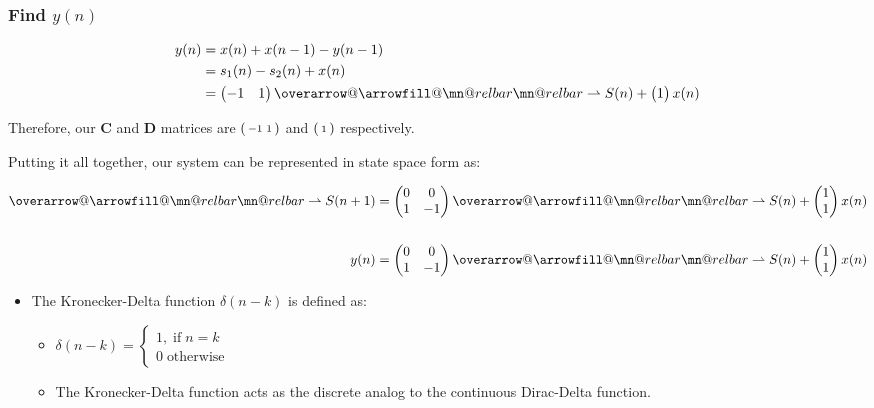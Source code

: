 \documentclass{article}
\makeatletter
\newenvironment{directsubsubs}{
  \makeatletter
  \renewcommand\thesubsubsection{\thesection.\Roman{subsubsection}}
  \makeatother
}{
  \makeatletter
  \renewcommand\thesubsubsection{\thesubsection.\Roman{subsubsection}}
  \makeatother
}
\renewcommand{\thesubsection}{\thesection.\alph{subsection}}
\renewcommand{\thesubsubsection}{\thesection.\alph{subsection}.\Roman{subsubsection}}
\DeclareRobustCommand{\overrightharpoon}{\mathpalette{\overarrow@\rightharpoonfill@}}
\def\rightharpoonfill@{\arrowfill@\mn@relbar\mn@relbar\rightharpoonup}
\makeatother
\begin{document}
\begin{directsubsubs}
\subsubsection[~\thesubsubsection]{Find $y(n)$}

\begin{align*}
	y(n) &= x(n) + x(n-1) - y(n-1) \\
	&= s_1(n) - s_2(n) + x(n) \\
	&= \begin{pmatrix} -1 & 1 \end{pmatrix}\overrightharpoon{S(n)} + \begin{pmatrix} 1 \end{pmatrix}x(n)
\end{align*}

Therefore, our $\boldsymbol{C}$ and $\boldsymbol{D}$ matrices are $\begin{psmallmatrix} -1 & 1 \end{psmallmatrix}$ and $\begin{psmallmatrix} 1 \end{psmallmatrix}$ respectively.

Putting it all together, our system can be represented in state space form as:

\begin{align*}
	\overrightharpoon{S(n+1)} &= \begin{pmatrix} 0 & 0 \\ 1 & -1 \end{pmatrix}\overrightharpoon{S(n)} + \begin{pmatrix} 1 \\ 1 \end{pmatrix}x(n) \\ \\
	y(n) &= \begin{pmatrix} 0 & 0 \\ 1 & -1 \end{pmatrix}\overrightharpoon{S(n)} + \begin{pmatrix} 1 \\ 1 \end{pmatrix}x(n)
\end{align*}

\begin{itemize}
	\item The Kronecker-Delta function $\delta(n - k)$ is defined as:
	\begin{itemize}
		\item $\delta(n - k) = \begin{cases} 1, \; \text{if} \; n = k \\ 0 \; \text{otherwise} \end{cases}$
		\item The Kronecker-Delta function acts as the discrete analog to the continuous Dirac-Delta function.
	\end{itemize}
\end{itemize}

\end{directsubsubs}
\end{document}
